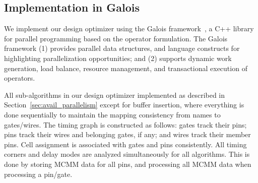 \subsection{Implementation in Galois}

We implement our design optimizer using the Galois framework~\cite{nguyen:2013,Lenharth:2016}, a C++ library for parallel programming based on the operator formulation. The Galois framework (1) provides parallel data structures, and language constructs for highlighting parallelization opportunities; and (2) supports dynamic work generation, load balance, resource management, and transactional execution of operators.

All sub-algorithms in our design optimizer implemented as described in Section~\ref{sec:avail_parallelism} except for buffer insertion, where everything is done sequentially to maintain the mapping consistency from names to gates/wires. The timing graph is constructed as follows: gates track their pins; pins track their wires and belonging gates, if any; and wires track their member pins. Cell assignment is associated with gates and pins consistently. All timing corners and delay modes are analyzed simultaneously for all algorithms. This is done by storing MCMM data for all pins, and processing all MCMM data when processing a pin/gate.
